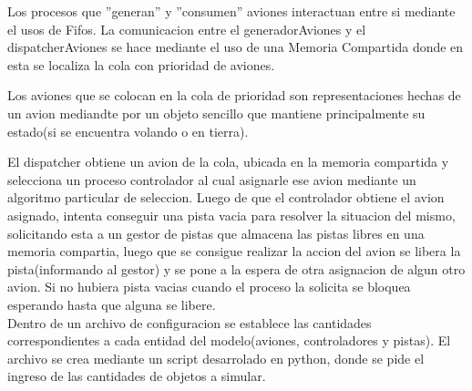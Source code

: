 \documentclass[a4paper,12pt,titlepage]{article}
\begin{document}
Los procesos que ''generan'' y ''consumen'' aviones interactuan entre si mediante el usos de Fifos. La comunicacion entre el generadorAviones y el dispatcherAviones se hace mediante el uso de una Memoria Compartida donde en esta se localiza la cola con prioridad de aviones. 

Los aviones que se colocan en la cola de prioridad son representaciones hechas de un avion mediandte por un objeto sencillo que mantiene principalmente su estado(si se encuentra volando o en tierra).

El dispatcher obtiene un avion de la cola, ubicada en la memoria compartida y selecciona un proceso controlador al cual asignarle ese avion mediante un algoritmo particular de seleccion.
Luego de que el controlador obtiene el avion asignado, intenta conseguir una pista vacia para resolver la situacion del mismo, solicitando esta a un gestor de pistas que almacena las pistas libres en una memoria compartia, luego que se consigue realizar la accion del avion se libera la pista(informando al gestor) y se pone a la espera de otra asignacion de algun otro avion. Si no hubiera pista vacias cuando el proceso la solicita se bloquea esperando hasta que alguna se libere.\\


Dentro de un archivo de configuracion se establece las cantidades correspondientes a cada entidad del modelo(aviones, controladores y pistas). El archivo se crea mediante un script desarrolado en python, donde se pide el ingreso de las cantidades de objetos a simular.
\end{document}
